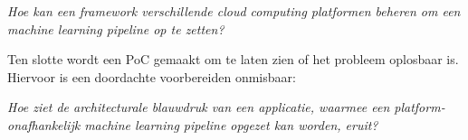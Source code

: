 \begin{quoting}
  \begin{center}
    \textit{
      Hoe kan een framework verschillende cloud computing platformen beheren om een machine learning pipeline op te zetten?
    }
  \end{center}
\end{quoting}\smallskip

Ten slotte wordt een PoC gemaakt om te laten zien of het probleem oplosbaar is. Hiervoor is een doordachte voorbereiden onmisbaar:

\begin{quoting}
  \begin{center}
    \textit{
      Hoe ziet de architecturale blauwdruk van een applicatie, waarmee een platform-onafhankelijk machine learning pipeline opgezet kan worden, eruit?
    }
  \end{center}
\end{quoting}









